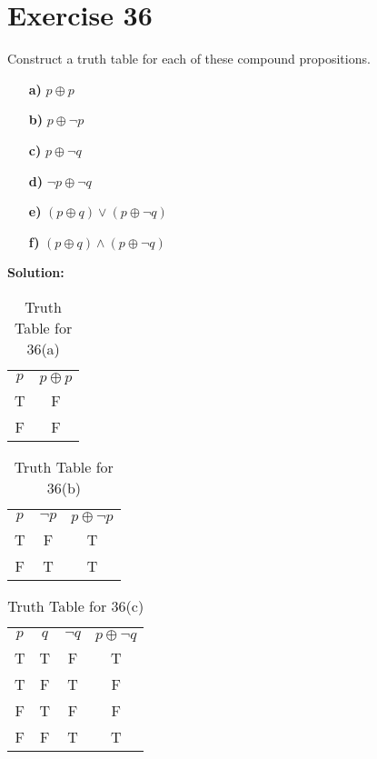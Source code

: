 \documentclass{Axon}
\begin{document}
\section*{Exercise 36}
Construct a truth table for each of these compound propositions.
\begin{enumerate}
    \item[\textbf{a)}] \(p \oplus p\)
    \item[\textbf{b)}] \(p \oplus \lnot p\)
    \item[\textbf{c)}] \(p \oplus \lnot q\)
    \item[\textbf{d)}] \(\lnot p \oplus \lnot q\)
    \item[\textbf{e)}] \((p \oplus q) \lor (p \oplus \lnot q)\)
    \item[\textbf{f)}] \((p \oplus q) \land (p \oplus \lnot q)\)
\end{enumerate}

\noindent
\textbf{Solution:}
\begin{table}[ht]
    \centering
    \begin{tabular}{c|c}
        \(p\) & \(p \oplus p\) \\
        T     & F              \\
        F     & F
    \end{tabular}
    \caption{Truth Table for 36(a)}
\end{table}

\begin{table}[ht]
    \centering
    \begin{tabular}{c|c|c}
        \(p\) & \(\lnot p\) & \(p \oplus \lnot p\) \\
        T     & F           & T                    \\
        F     & T           & T
    \end{tabular}
    \caption{Truth Table for 36(b)}
\end{table}

\begin{table}[ht]
    \centering
    \begin{tabular}{c|c|c|c}
        \(p\) & \(q\) & \(\lnot q\) & \(p \oplus \lnot q\) \\
        T     & T     & F           & T                    \\
        T     & F     & T           & F                    \\
        F     & T     & F           & F                    \\
        F     & F     & T           & T
    \end{tabular}
    \caption{Truth Table for 36(c)}
\end{table}
\end{document}
